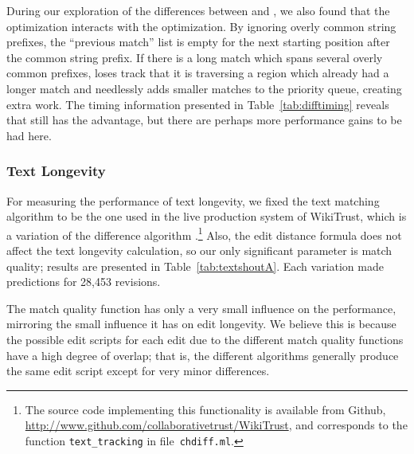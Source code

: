 During our exploration of the differences between 
and , we also found that the 
optimization interacts with the  optimization.
By ignoring overly common string prefixes, the ``previous match'' list
is empty for the next starting position after the common string prefix.
If there is a long match which spans several overly common prefixes,
 loses track that it is traversing a region which
already had a longer match and needlessly adds smaller matches to the
priority queue, creating extra work.
The timing information presented in Table~\ref{tab:difftiming} reveals
that  still has the advantage, but there are perhaps
more performance gains to be had here.


\subsubsection{Text Longevity}

For measuring the performance of text longevity,
we fixed the text matching algorithm to be the one
used in the live production system of WikiTrust,
which is a variation of the difference algorithm
.\footnote{The source code implementing
this functionality is available from Github,
\url{http://www.github.com/collaborativetrust/WikiTrust},
and corresponds to the function \texttt{text\_tracking}
in file~\texttt{chdiff.ml}.}
Also, the edit distance formula does not affect the text longevity calculation,
so our only significant parameter is match quality;
results are presented in Table~\ref{tab:textshoutA}.
Each variation made predictions for 28,453 revisions.

The match quality function has only a very small influence on
the performance, mirroring the small influence it has on edit longevity.
We believe this is because the possible edit scripts for
each edit due to the different match quality functions
have a high degree of overlap; that is,
the different algorithms generally produce the same edit script
except for very minor differences.


